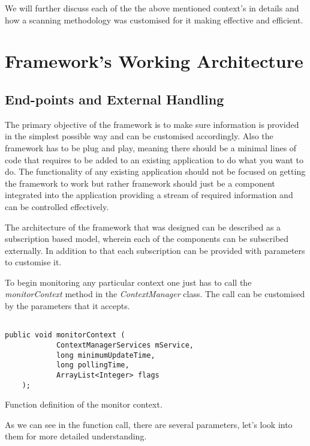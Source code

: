 \documentclass[12pt]{report}
\begin{document}
We will further discuss each of the the above mentioned context's in details and how a scanning methodology was customised for it making effective and efficient.
 
\section{Framework's Working Architecture}
\subsection{End-points and External Handling}
\label{ExternalHandling}
The primary objective of the framework is to make sure information is provided in the simplest possible way and can be customised accordingly. Also the framework has to be plug and play, meaning there should be a minimal lines of code that requires to be added to an existing application to do what you want to do. The functionality of any existing application should not be focused on getting the framework to work but rather framework should just be a component integrated into the application providing a stream of required information and can be controlled effectively. 

The architecture of the framework that was designed can be described as a subscription based model, wherein each of the components can be subscribed externally. In addition to that each subscription can be provided with parameters to customise it.

To begin monitoring any particular context one just has to call the \textit{monitorContext} method in the \textit{ContextManager} class. The call can be customised by the parameters that it accepts.

\begin{program}
  \begin{verbatim}

public void monitorContext (
            ContextManagerServices mService,
            long minimumUpdateTime,
            long pollingTime,
            ArrayList<Integer> flags
    );
\end{verbatim}
\label{monitorContextCall}
\caption{Function definition of the monitor context.}
\end{program}

As we can see in the function call, there are several parameters, let's look into them for more detailed understanding.
\end{document}
